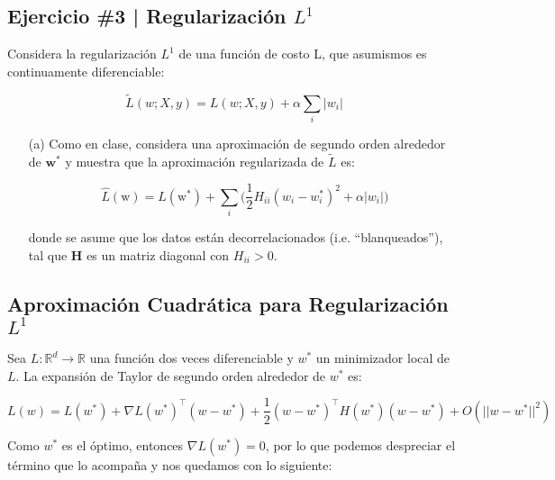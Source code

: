 \newpage

\begin{myblock}
\section*{Ejercicio \#3 | Regularización $L^1$}

Considera la regularización $L^1$ de una función de costo L, que asumismos es continuamente
diferenciable: 

\[
    \tilde{L}(w; X, y) = L(w; X, y) + \alpha \sum_i |w_i|
\]

\begin{itemize}
    \item[(a)] Como en clase, considera una aproximación de segundo orden alrededor
    de $\textbf{w}^*$ y muestra que la aproximación regularizada de $\tilde{L}$ es:

    \[
        \hat{L}(\text{w}) = L(\text{w}^*) + \sum_i \bigg(\frac{1}{2} H_{ii} (w_i - w_i^*)^2 + \alpha |w_i|\bigg)
    \]  

    donde se asume que los datos están decorrelacionados (i.e. ``blanqueados''), tal
    que \textbf{H} es un matriz diagonal con $H_{ii} > 0$.
\end{itemize}

\end{myblock}


\subsection{Aproximación Cuadrática para Regularización $L^1$}

Sea $L: \mathbb{R}^d \rightarrow \mathbb{R}$ una función dos veces diferenciable y $w^*$ un minimizador
local de $L$. La expansión de Taylor de segundo orden alrededor de $w^*$ es:

\[
    L(w) = L(w^*) + \nabla L(w^*)^\top (w - w^*) + \frac{1}{2} (w - w^*)^\top H(w^*)(w - w^*) + O(|| w - w^* ||^2)
\]

Como $w^*$ es el óptimo, entonces $\nabla L (w^*) = 0$, por lo que podemos despreciar el término que
lo acompaña y nos quedamos con lo siguiente:

